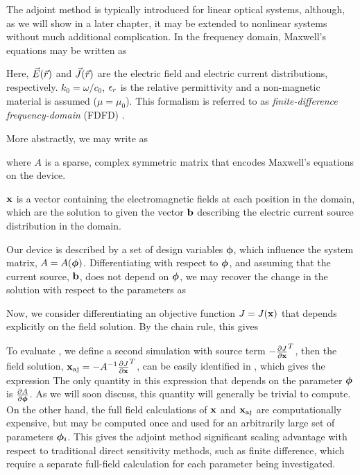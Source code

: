 The adjoint method is typically introduced for linear optical systems, although, as we will show in a later chapter, it may be extended to nonlinear systems without much additional complication.
In the frequency domain, Maxwell's equations may be written as

%
Here, $\vec{E}(\vec{r})$ and $\vec{J}(\vec{r})$ are the electric field and electric current distributions, respectively. $k_0 = \omega/c_0$, $\epsilon_r$ is the relative permittivity and a non-magnetic material is assumed ($\mu = \mu_0$).
This formalism is referred to as \textit{finite-difference frequency-domain} (FDFD) \cite{shin2012choice, taflove2000computational}.

More abstractly, we may write  as
%

%
where $A$ is a sparse, complex symmetric matrix that encodes Maxwell's equations on the device.

$\mathbf{x}$ is a vector containing the electromagnetic fields at each position in the domain, which are the solution to  given the vector $\mathbf{b}$ describing the electric current source distribution in the domain.

Our device is described by a set of design variables $\bm{\phi}$, which influence the system matrix, $A = A(\bm{\phi})$.
Differentiating  with respect to $\bm{\phi}$, and assuming that the current source, $\mathbf{b}$, does not depend on $\bm{\phi}$, we may recover the change in the solution with respect to the parameters as
%

Now, we consider differentiating an objective function $J = J(\mathbf{x})$ that depends explicitly on the field solution.
By the chain rule, this gives
%

To evaluate , we define a second simulation with source term $-\frac{\partial J}{\partial \mathbf{x}}^T$,
%
%
then the field solution, $\mathbf{x}_{\textrm{aj}} = -A^{-1}\frac{\partial J}{\partial \mathbf{x}}^T$, can be easily identified in , which gives the expression
%
%
The only quantity in this expression that depends on the parameter $\bm{\phi}$ is $\frac{\partial A}{\partial \bm{\phi}}$.
As we will soon discuss, this quantity will generally be trivial to compute.
On the other hand, the full field calculations of $\mathbf{x}$ and $\mathbf{x}_{\textrm{aj}}$ are computationally expensive, but may be computed once and used for an arbitrarily large set of parameters $\bm{\phi}_i$.
This gives the adjoint method significant scaling advantage with respect to traditional direct sensitivity methods, such as finite difference, which require a separate full-field calculation for each parameter being investigated.

